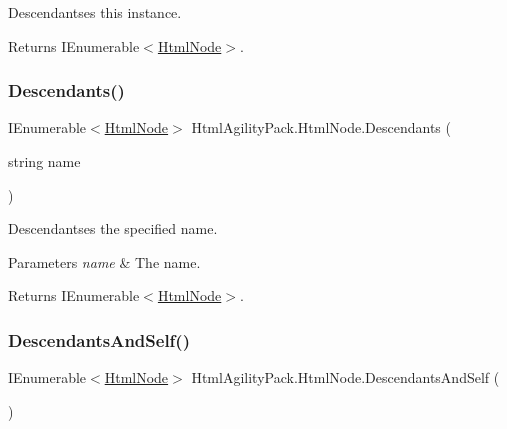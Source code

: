 Descendantses this instance. 

\begin{DoxyReturn}{Returns}
I\+Enumerable$<$\hyperlink{class_html_agility_pack_1_1_html_node}{Html\+Node}$>$.
\end{DoxyReturn}
\mbox{\label{class_html_agility_pack_1_1_html_node_a8ff51a9f8d637df9ed69c68b235c1694}} 
\subsubsection{\texorpdfstring{Descendants()}{Descendants()}\hspace{0.1cm}{\footnotesize\ttfamily [2/2]}}
{\footnotesize\ttfamily I\+Enumerable$<$\hyperlink{class_html_agility_pack_1_1_html_node}{Html\+Node}$>$ Html\+Agility\+Pack.\+Html\+Node.\+Descendants (\begin{DoxyParamCaption}\item[{string}]{name }\end{DoxyParamCaption})\hspace{0.3cm}{\ttfamily [inline]}}



Descendantses the specified name. 


\begin{DoxyParams}{Parameters}
{\em name} & The name.\\
\hline
\end{DoxyParams}
\begin{DoxyReturn}{Returns}
I\+Enumerable$<$\hyperlink{class_html_agility_pack_1_1_html_node}{Html\+Node}$>$.
\end{DoxyReturn}
\mbox{\label{class_html_agility_pack_1_1_html_node_af2d47d0113e0f08967096c362e12c5d7}} 
\subsubsection{\texorpdfstring{Descendants\+And\+Self()}{DescendantsAndSelf()}\hspace{0.1cm}{\footnotesize\ttfamily [1/2]}}
{\footnotesize\ttfamily I\+Enumerable$<$\hyperlink{class_html_agility_pack_1_1_html_node}{Html\+Node}$>$ Html\+Agility\+Pack.\+Html\+Node.\+Descendants\+And\+Self (\begin{DoxyParamCaption}{ }\end{DoxyParamCaption})\hspace{0.3cm}{\ttfamily [inline]}}



